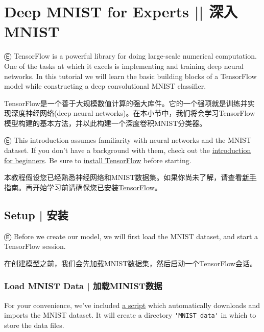 



\newpage
\section {\textcolor{etc}{Deep MNIST for Experts}   ||   深入MNIST} \label{MINIST_pros}

Ⓔ \textcolor{etc}{TensorFlow is a powerful library for doing large-scale numerical computation. One of the tasks at which it excels is implementing and training deep neural networks. In this tutorial we will learn the basic building blocks of a TensorFlow model while constructing a deep convolutional MNIST classifier.}

TensorFlow是一个善于大规模数值计算的强大库件。它的一个强项就是训练并实现深度神经网络(deep neural networks)。在本小节中，我们将会学习TensorFlow模型构建的基本方法，并以此构建一个深度卷积MNIST分类器。

Ⓔ \textcolor{etc}{This introduction assumes familiarity with neural networks and the MNIST dataset. If you don't have a background with them, check out the \hyperref[MINIST_beginner]{introduction for beginners}. Be sure to \hyperref[download_install]{install TensorFlow} before starting.}

本教程假设您已经熟悉神经网络和MNIST数据集。如果你尚未了解，请查看\hyperref[MINIST_beginner]{新手指南}。再开始学习前请确保您已\hyperref[download_install]{安装TensorFlow}。

%
\subsection {Setup   |   安装}

Ⓔ \textcolor{etc}{Before we create our model, we will first load the MNIST dataset, and start a TensorFlow session.}

在创建模型之前，我们会先加载MNIST数据集，然后启动一个TensorFlow会话。

\subsubsection {Load MNIST Data  |  加载MINIST数据}

\textcolor{etc}{For your convenience, we've included \href{https://tensorflow.googlesource.com/tensorflow/+/master/tensorflow/examples/tutorials/mnist/input_data.py}{a script} which automatically downloads and imports the MNIST dataset. It will create a directory \lstinline{'MNIST_data'} in which to store the data files.}

